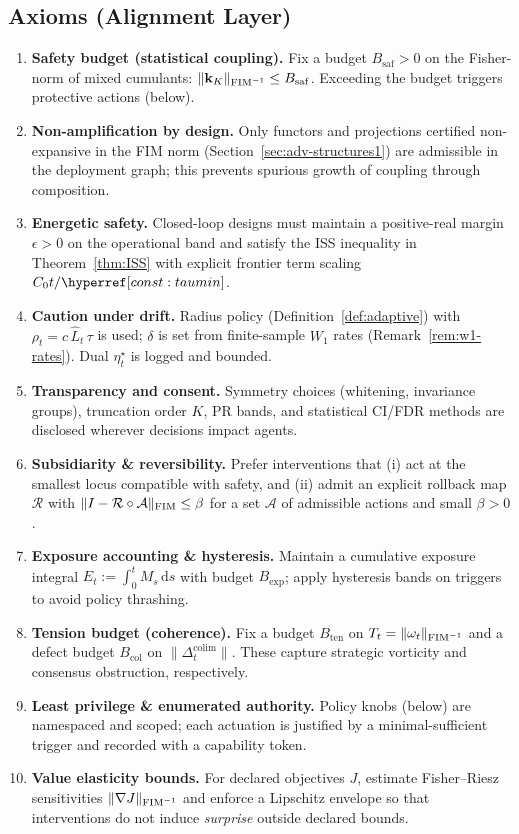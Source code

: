 \subsection*{Axioms (Alignment Layer)}
\begin{enumerate}[leftmargin=*]
  \item \textbf{Safety budget (statistical coupling).} Fix a budget $B_{\mathrm{saf}}>0$ on the Fisher-norm of mixed cumulants: $\|\mathbf k_K\|_{\mathrm{FIM}^{-1}}\le B_{\mathrm{saf}}$. Exceeding the budget triggers protective actions (below).
  \item \textbf{Non-amplification by design.} Only functors and projections certified non-expansive in the FIM norm (Section~\ref{sec:adv-structures1}) are admissible in the deployment graph; this prevents spurious growth of coupling through composition.
  \item \textbf{Energetic safety.} Closed-loop designs must maintain a positive-real margin $\epsilon>0$ on the operational band and satisfy the ISS inequality in Theorem~\ref{thm:ISS} with explicit frontier term scaling $C_0 t/\constref{taumin}$.
  \item \textbf{Caution under drift.} Radius policy (Definition~\ref{def:adaptive}) with $\rho_t=c\,\widehat L_t\,\tau$ is used; $\delta$ is set from finite-sample $W_1$ rates (Remark~\ref{rem:w1-rates}). Dual $\eta^\star_t$ is logged and bounded.
  \item \textbf{Transparency and consent.} Symmetry choices (whitening, invariance groups), truncation order $K$, PR bands, and statistical CI/FDR methods are disclosed wherever decisions impact agents.
  \item \textbf{Subsidiarity \& reversibility.} Prefer interventions that (i) act at the smallest locus compatible with safety, and (ii) admit an explicit rollback map $\mathcal R$ with $\|I-\mathcal R\circ\mathcal A\|_{\mathrm{FIM}}\le \beta$ for a set $\mathcal A$ of admissible actions and small $\beta>0$.
  \item \textbf{Exposure accounting \& hysteresis.} Maintain a cumulative exposure integral $E_t:=\int_0^t M_s\,\mathrm ds$ with budget $B_{\mathrm{exp}}$; apply hysteresis bands on triggers to avoid policy thrashing.
  \item \textbf{Tension budget (coherence).} Fix a budget $B_{\mathrm{ten}}$ on $T_t=\|\omega_t\|_{\mathrm{FIM}^{-1}}$ and a defect budget $B_{\mathrm{col}}$ on $\|\Delta^{\mathrm{colim}}_t\|$. These capture strategic vorticity and consensus obstruction, respectively.
  \item \textbf{Least privilege \& enumerated authority.} Policy knobs (below) are namespaced and scoped; each actuation is justified by a minimal-sufficient trigger and recorded with a capability token.
  \item \textbf{Value elasticity bounds.} For declared objectives $J$, estimate Fisher--Riesz sensitivities $\|\nabla J\|_{\mathrm{FIM}^{-1}}$ and enforce a Lipschitz envelope so that interventions do not induce \emph{surprise} outside declared bounds.
\end{enumerate}

